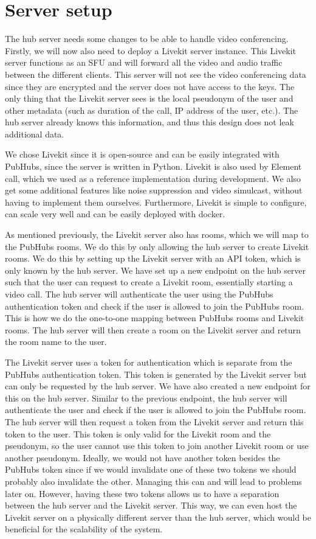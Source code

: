 \documentclass{report}
\begin{document}
\section{Server setup}\label{sec:server-setup}
The hub server needs some changes to be able to handle video conferencing. Firstly, we will now also need to deploy a
Livekit server instance. This Livekit server functions as an SFU and will forward all the video and audio traffic
between the different clients. This server will not see the video conferencing data since they are
encrypted and the server does not have access to the keys. The only thing that the Livekit server sees is the local
pseudonym of the user and other metadata (such as duration of the call, IP address of the user, etc.). The hub
server already knows this information, and thus this design does not leak additional data.

We chose Livekit since it is open-source and can be easily integrated with PubHubs, since the server is written in
Python. Livekit is also used by Element call, which we used as a reference implementation during development. We
also get some additional features like noise suppression and video simulcast, without having to implement them
ourselves. Furthermore, Livekit is simple to configure, can scale very well and can be easily deployed with docker.

As mentioned previously, the Livekit server also has rooms, which we will map to the PubHubs rooms. We do this by
only allowing the hub server to create Livekit rooms. We do this by setting up the Livekit server with an API token,
which is only known by the hub server. We have set up a new endpoint on the hub server such that the user can request
to create a Livekit room, essentially starting a video call. The hub server will authenticate the user using the PubHubs
authentication token and check if the user is allowed to join the PubHubs room. This is how we do the one-to-one mapping
between PubHubs rooms and Livekit rooms. The hub server will then create a room on the Livekit server and return the
room name to the user.

The Livekit server uses a token for authentication which is separate from the PubHubs authentication token.
This token is generated by the Livekit server but can only be requested by the hub server.
We have also created a new endpoint for this on the hub server. Similar to the previous endpoint, the hub server will
authenticate the user and check if the user is allowed to join the PubHubs room. The hub server will then request a
token from the Livekit server and return this token to the user. This token is only valid for the Livekit room and the
pseudonym, so the user cannot use this token to join another Livekit room or use another pseudonym. Ideally, we would
not have another token besides the PubHubs token since if we would invalidate one of these two tokens we should probably
also invalidate the other. Managing this can and will lead to problems later on. However, having these two tokens
allows us to have a separation between the hub server and the Livekit server. This way, we can even host the Livekit
server on a physically different server than the hub server, which would be beneficial for the scalability of the
system.
\end{document}
